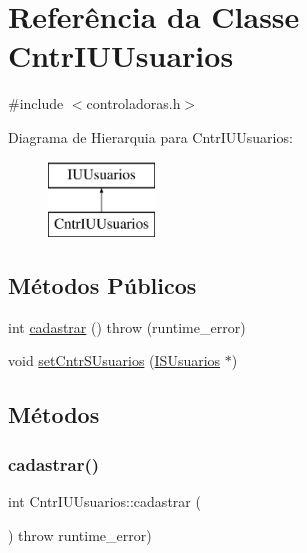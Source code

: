 \hypertarget{class_cntr_i_u_usuarios}{}\section{Referência da Classe Cntr\+I\+U\+Usuarios}
\label{class_cntr_i_u_usuarios}


{\ttfamily \#include $<$controladoras.\+h$>$}

Diagrama de Hierarquia para Cntr\+I\+U\+Usuarios\+:\begin{figure}[H]
\begin{center}
\leavevmode
\includegraphics[height=2.000000cm]{class_cntr_i_u_usuarios}
\end{center}
\end{figure}
\subsection*{Métodos Públicos}
\begin{DoxyCompactItemize}
\item 
int \hyperlink{class_cntr_i_u_usuarios_aae4e9c98b9bf8491671968429ad09fcb}{cadastrar} ()  throw (runtime\+\_\+error)
\item 
void \hyperlink{class_cntr_i_u_usuarios_adf37aa596e2e079a281179d04914631d}{set\+Cntr\+S\+Usuarios} (\hyperlink{class_i_s_usuarios}{I\+S\+Usuarios} $\ast$)
\end{DoxyCompactItemize}


\subsection{Métodos}
\mbox{\label{class_cntr_i_u_usuarios_aae4e9c98b9bf8491671968429ad09fcb}} 
\subsubsection{\texorpdfstring{cadastrar()}{cadastrar()}}
{\footnotesize\ttfamily int Cntr\+I\+U\+Usuarios\+::cadastrar (\begin{DoxyParamCaption}{ }\end{DoxyParamCaption}) throw  runtime\+\_\+error) \hspace{0.3cm}{\ttfamily [virtual]}}

